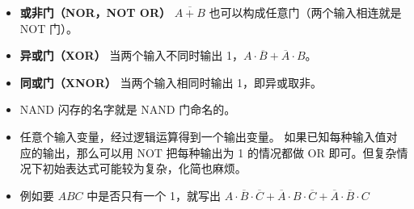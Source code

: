 \begin{itemize}
\item \textbf{或非门（NOR，NOT OR）} $\overline{A+B}$ 也可以构成任意门（两个输入相连就是 NOT 门）。
\item \textbf{异或门（XOR）} 当两个输入不同时输出 1，$A\cdot\overline B+\overline A\cdot B$。
\item \textbf{同或门（XNOR）} 当两个输入相同时输出 1，即异或取非。
\item NAND 闪存的名字就是 NAND 门命名的。
\item 任意个输入变量，经过逻辑运算得到一个输出变量。 如果已知每种输入值对应的输出，那么可以用 NOT 把每种输出为 1 的情况都做 OR 即可。但复杂情况下初始表达式可能较为复杂，化简也麻烦。
\item 例如要 $ABC$ 中是否只有一个 1，就写出 $A\cdot\overline B\cdot\overline C + \overline A\cdot B\cdot\overline C + \overline A\cdot\overline B\cdot C$

\end{itemize}
